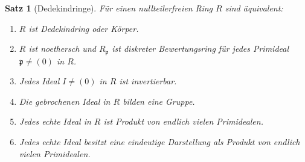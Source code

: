 \documentclass[a4paper,12pt]{scrbook}
\theoremstyle{break}
\newtheorem{Satz}{Satz}
\theoremstyle{nonumberbreak}
\theoremstyle{nonumberplain}
\begin{document}
\begin{Satz}[Dedekindringe]\label{Satz13}
Für einen nullteilerfreien Ring $R$ sind äquivalent:

\begin{enumerate}
\item[(i)] $R$ ist Dedekindring oder Körper.

\item[(ii)] $R$ ist noethersch und $R_\mathfrak{p}$ ist diskreter Bewertungsring für jedes Primideal $\mathfrak{p} \neq (0)$ in $R$.

\item[(iii)] Jedes Ideal $I \neq (0)$ in $R$ ist invertierbar.

\item[(iv)] Die gebrochenen Ideal in $R$ bilden eine Gruppe.

\item[(v)] Jedes echte Ideal in $R$ ist Produkt von endlich vielen Primidealen.

\item[(vi)] Jedes echte Ideal besitzt eine eindeutige Darstellung als Produkt von endlich vielen Primidealen.
\end{enumerate}

\end{Satz}
\end{document}
